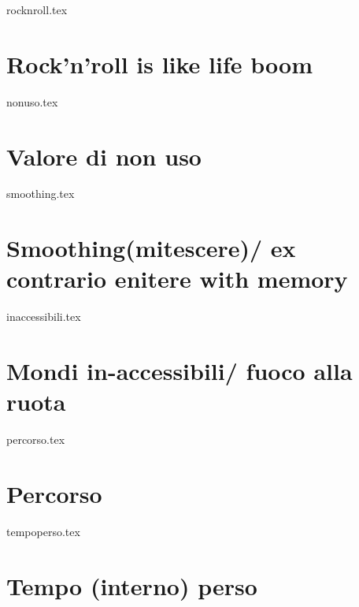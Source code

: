 \begin{filecontents}{rocknroll.tex}

\section{Rock'n'roll is like life  boom}

\end{filecontents}

\begin{filecontents}{nonuso.tex}

\section{Valore di non uso}

\end{filecontents}

\begin{filecontents}{smoothing.tex}

\section{Smoothing(mitescere)/ ex contrario enitere with memory}

\end{filecontents}

\begin{filecontents}{inaccessibili.tex}

\section{Mondi in-accessibili/ fuoco alla ruota}

\end{filecontents}

\begin{filecontents}{percorso.tex}

\section{Percorso}

\end{filecontents}

\begin{filecontents}{tempoperso.tex}

\section{Tempo (interno) perso}

\end{filecontents}
























